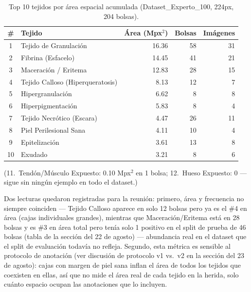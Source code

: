 \documentclass[12pt,letterpaper]{report}
\newcommand{\entrada}[2]{%
    \vspace{0.6em}
    \noindent\textbf{#1.} \textit{#2}
    \vspace{0.3em}
    \par
}
\begin{document}
\begin{table}[H]
\centering
\caption{Top 10 tejidos por área espacial acumulada (Dataset\_Experto\_100, 224px, 204 bolsas).}
\begin{tabular}{clrrr}
\toprule
\# & Tejido & Área (Mpx$^2$) & Bolsas & Imágenes \\
\midrule
1  & Tejido de Granulación             & 16.36 & 58 & 31 \\
2  & Fibrina (Esfacelo)                & 14.45 & 41 & 21 \\
3  & Maceración / Eritema              & 12.83 & 28 & 15 \\
4  & Tejido Calloso (Hiperqueratosis)  & 8.13  & 12 & 7  \\
5  & Hipergranulación                  & 6.62  & 8  & 8  \\
6  & Hiperpigmentación                 & 5.83  & 8  & 4  \\
7  & Tejido Necrótico (Escara)         & 4.47  & 26 & 11 \\
8  & Piel Perilesional Sana            & 4.11  & 10 & 4  \\
9  & Epitelización                     & 3.61  & 13 & 8  \\
10 & Exudado                           & 3.21  & 8  & 6  \\
\bottomrule
\end{tabular}
\end{table}

\noindent (11.\ Tendón/Músculo Expuesto: 0.10 Mpx$^2$ en 1 bolsa; 12.\ Hueso Expuesto: 0 --- sigue sin
ningún ejemplo en todo el dataset.)

Dos lecturas quedaron registradas para la reunión: primero, área y frecuencia no siempre coinciden
--- Tejido Calloso aparece en solo 12 bolsas pero ya es el \#4 en área (cajas individuales grandes),
mientras que Maceración/Eritema está en 28 bolsas y es \#3 en área total pero tenía solo 1 positivo en
el split de prueba de 46 bolsas (tabla de la sección del 22 de agosto) --- abundancia real en el
dataset que el split de evaluación todavía no refleja. Segundo, esta métrica es sensible al protocolo
de anotación (ver discusión de protocolo v1 vs.\ v2 en la sección del 23 de agosto): cajas con margen
de piel sana inflan el área de todos los tejidos que coexisten en ellas, así que no mide el área real
de cada tejido en la herida, solo cuánto espacio ocupan las anotaciones que lo incluyen.

\end{document}
